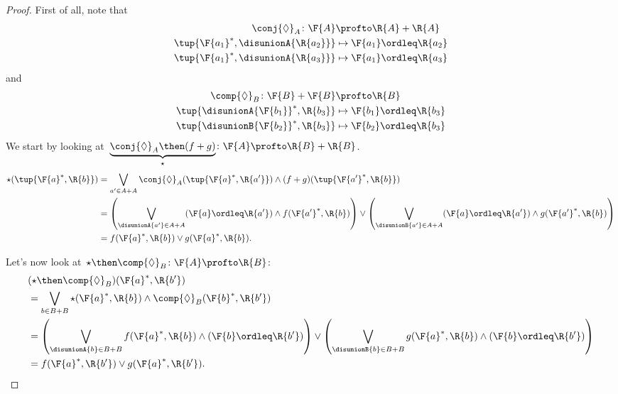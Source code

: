 \begin{proof}
  First of all, note that
  \begin{equation}
    \begin{aligned}
      \conj{\Diamond}_A\colon \F{A}&\profto \R{A}+\R{A}\\
      \tup{\F{a_1}^*,\disunionA{\R{a_2}}}&\mapsto \F{a_1}\ordleq \R{a_2}\\
      \tup{\F{a_1}^*,\disunionA{\R{a_3}}}&\mapsto \F{a_1}\ordleq \R{a_3}
    \end{aligned}
  \end{equation}
  and
  \begin{equation}
    \begin{aligned}
      \comp{\Diamond}_B\colon \F{B}+\F{B}&\profto \R{B}\\
      \tup{\disunionA{\F{b_1}}^*,\R{b_3}}&\mapsto \F{b_1}\ordleq \R{b_3}\\
      \tup{\disunionB{\F{b_2}}^*,\R{b_3}}&\mapsto \F{b_2}\ordleq \R{b_3}
    \end{aligned}
  \end{equation}
  We start by looking at~$\underbrace{\conj{\Diamond}_A\then (f+g)}_{\star}\colon \F{A} \profto \R{B}+\R{B}$.
  \begin{equation}
    \begin{aligned}
      \star (\tup{\F{a}^*,\R{b}})&=\bigvee_{a'\in A+A} \conj{\Diamond}_A(\tup{\F{a}^*,\R{a'}})\wedge (f+g)(\tup{\F{a'}^*,\R{b}})\\
      &=\left( \bigvee_{\disunionA{a'}\in A+A} (\F{a}\ordleq \R{a'})\wedge f(\F{a'}^*,\R{b}) \right)\vee \left( \bigvee_{\disunionB{a'}\in A+A} (\F{a}\ordleq \R{a'})\wedge g(\F{a'}^*,\R{b}) \right)\\
      &=f(\F{a}^*,\R{b}) \vee g(\F{a}^*,\R{b}).
    \end{aligned}
  \end{equation}

  Let's now look at~$\star \then \comp{\Diamond}_B\colon \F{A} \profto \R{B}$:
  \begin{equation}
    \begin{aligned}
      &(\star \then \comp{\Diamond}_B)(\F{a}^*,\R{b'})\\
      &=\bigvee_{b\in B+B} \star(\F{a}^*,\R{b})\wedge \comp{\Diamond}_B(\F{b}^*,\R{b'}) \\
      &=\left(\bigvee_{\disunionA{b}\in B+B} f(\F{a}^*,\R{b}) \wedge (\F{b}\ordleq \R{b'})\right) \vee
      \left(\bigvee_{\disunionB{b}\in B+B} g(\F{a}^*,\R{b}) \wedge (\F{b}\ordleq \R{b'})\right)\\
      &=f(\F{a}^*,\R{b'})\vee g(\F{a}^*,\R{b'}).
    \end{aligned}
  \end{equation}
\end{proof}

